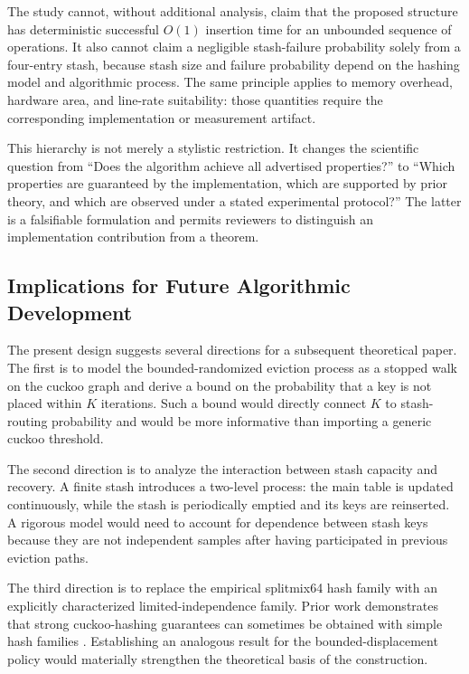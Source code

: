\documentclass[conference]{IEEEtran}
\begin{document}
The study cannot, without additional analysis, claim that the proposed
structure has deterministic successful $O(1)$ insertion time for an unbounded
sequence of operations. It also cannot claim a negligible stash-failure
probability solely from a four-entry stash, because stash size and failure
probability depend on the hashing model and algorithmic process. The same
principle applies to memory overhead, hardware area, and line-rate suitability:
those quantities require the corresponding implementation or measurement
artifact.

This hierarchy is not merely a stylistic restriction. It changes the
scientific question from ``Does the algorithm achieve all advertised
properties?'' to ``Which properties are guaranteed by the implementation,
which are supported by prior theory, and which are observed under a stated
experimental protocol?'' The latter is a falsifiable formulation and permits
reviewers to distinguish an implementation contribution from a theorem.

\subsection{Implications for Future Algorithmic Development}
\label{subsec:discussion_future_algorithm}

The present design suggests several directions for a subsequent theoretical
paper. The first is to model the bounded-randomized eviction process as a
stopped walk on the cuckoo graph and derive a bound on the probability that a
key is not placed within $K$ iterations. Such a bound would directly connect
$K$ to stash-routing probability and would be more informative than importing
a generic cuckoo threshold.

The second direction is to analyze the interaction between stash capacity and
recovery. A finite stash introduces a two-level process: the main table is
updated continuously, while the stash is periodically emptied and its keys are
reinserted. A rigorous model would need to account for dependence between
stash keys because they are not independent samples after having participated
in previous eviction paths.

The third direction is to replace the empirical splitmix64 hash family with an
explicitly characterized limited-independence family. Prior work demonstrates
that strong cuckoo-hashing guarantees can sometimes be obtained with simple
hash families \cite{aumuller2014explicit}. Establishing an analogous result for
the bounded-displacement policy would materially strengthen the theoretical
basis of the construction.
\end{document}
